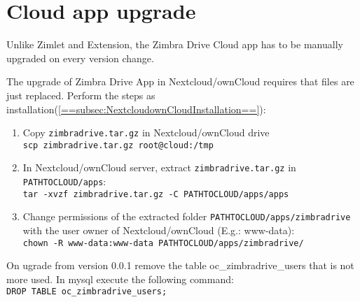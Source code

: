 \section{Cloud app upgrade}
Unlike Zimlet and Extension, the Zimbra Drive Cloud app has to be manually upgraded on every version change.

The upgrade of Zimbra Drive App in Nextcloud/ownCloud requires that files are just replaced.
Perform the steps as installation(\ref{==subsec:NextcloudownCloudInstallation==}):
    \begin{enumerate}
        \item Copy \texttt{zimbradrive.tar.gz} in Nextcloud/ownCloud drive\\ 
        \texttt{scp zimbradrive.tar.gz root@cloud:/tmp}

        \item In Nextcloud/ownCloud server, extract \texttt{zimbradrive.tar.gz}  in \texttt{PATH\textunderscore TO\textunderscore CLOUD/apps}:\\
        \texttt{tar -xvzf zimbradrive.tar.gz -C \texttt{PATH\textunderscore TO\textunderscore CLOUD/apps}/apps}

        \item Change permissions of the extracted folder \texttt{PATH\textunderscore TO\textunderscore CLOUD/apps/zimbradrive}
        with the user owner of Nextcloud/ownCloud (E.g.: www-data):\\
        \texttt{chown -R www-data:www-data PATH\textunderscore TO\textunderscore CLOUD/apps/zimbradrive/}
    \end{enumerate}

\begin{warning}
    On ugrade from version 0.0.1 remove the table oc\_zimbradrive\_users that is not more used. In mysql execute the following command:\\
    \texttt{DROP TABLE oc\_zimbradrive\_users;}
\end{warning}
